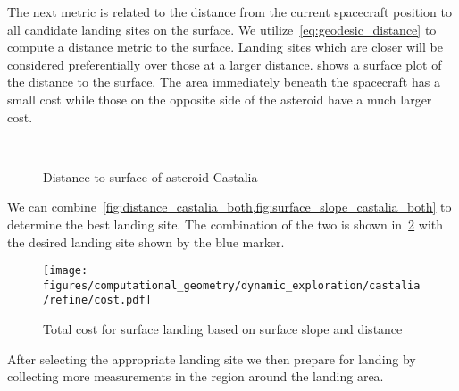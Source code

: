 \documentclass[letterpaper, paper,11pt]{AAS}		%
\begin{document}
The next metric is related to the distance from the current spacecraft position to all candidate landing sites on the surface.
We utilize~\cref{eq:geodesic_distance} to compute a distance metric to the surface.
Landing sites which are closer will be considered preferentially over those at a larger distance.
 shows a surface plot of the distance to the surface. 
The area immediately beneath the spacecraft has a small cost while those on the opposite side of the asteroid have a much larger cost.
\begin{figure}[htbp]
    \centering
    \\%
    \caption{Distance to surface of asteroid Castalia\label{fig:distance_castalia_both}}
\end{figure}
We can combine~\cref{fig:distance_castalia_both,fig:surface_slope_castalia_both} to determine the best landing site. 
The combination of the two is shown in~\cref{fig:landing_site_cost} with the desired landing site shown by the blue marker.
\begin{figure}[htbp]
    \centering
    \texttt{[image: figures/computational\_geometry/dynamic\_exploration/castalia/refine/cost.pdf]}
    \caption{Total cost for surface landing based on surface slope and distance\label{fig:landing_site_cost}}
\end{figure}
After selecting the appropriate landing site we then prepare for landing by collecting more measurements in the region around the landing area.
\end{document}
